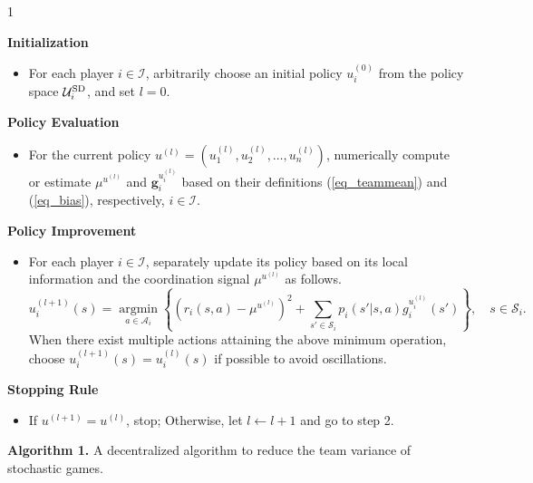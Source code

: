 \documentclass[12pt]{article}
\DeclareMathOperator*{\argmin}{argmin}
\begin{document}
\begin{center}
\begin{boxedminipage}{1\columnwidth}
\vspace{5pt}



\noindent\textbf{ Initialization}
\begin{itemize}
\item{For each player $i \in \mathcal I$, arbitrarily choose an initial policy $u^{(0)}_i$ from the policy space $\mathcal U^{\rm SD}_i$, and set $l=0$.}
\end{itemize}

\noindent\textbf{ Policy Evaluation}
\begin{itemize}
\item{For the current policy $u^{(l)}=(u^{(l)}_1,u^{(l)}_2,\dots,u^{(l)}_n)$, numerically compute or estimate $\mu^{u^{(l)}}$ and $\bm g^{u_i^{(l)}}_i$
based on their definitions (\ref{eq_teammean}) and (\ref{eq_bias}),
respectively, $i \in \mathcal I$.}
\end{itemize}

\noindent\textbf{ Policy Improvement}
\begin{itemize}
\item{For each player $i \in \mathcal I$, separately update its policy based on
its local information and the coordination signal $\mu^{u^{(l)}}$ as
follows.
\begin{equation}\label{eq_policyimprov}
u^{(l+1)}_i(s) = \argmin\limits_{a \in \mathcal A_i}\left\{
(r_i(s,a) - \mu^{u^{(l)}})^2 + \sum_{s' \in \mathcal
S_i}p_i(s'|s,a)g^{u_i^{(l)}}_{i}(s') \right\},  \quad s \in \mathcal
S_i.
\end{equation}
When there exist multiple actions attaining the above minimum
operation, choose $u_i^{(l+1)}(s)=u_i^{(l)}(s)$ if possible to avoid
oscillations.}
\end{itemize}

\noindent\textbf{ Stopping Rule}
\begin{itemize}
\item{If $u^{(l+1)} = u^{(l)}$, stop; Otherwise, let $l \leftarrow l+1$ and go to step 2.}
\end{itemize}

\vspace{3pt}
\end{boxedminipage}

\textbf{Algorithm 1.} A decentralized algorithm to reduce the team
variance of stochastic games.
\end{center}
\end{document}
